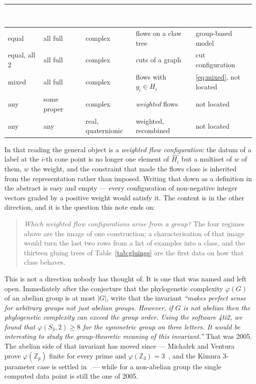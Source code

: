\documentclass[11pt,a4paper]{article}
\theoremstyle{definition}
\newcommand{\ZZ}{\mathbb{Z}}
\begin{document}
\begin{center}\small
\begin{tabular}{lllll}
\toprule
\rowcolor{hdrblue}
\textcolor{white}{cone orders} & \textcolor{white}{stabilisers} & \textcolor{white}{type} &
\textcolor{white}{configuration} & \textcolor{white}{name}\\
\midrule
equal & all full & complex & flows on a claw tree & group-based model~\cite{SSphylo}\\
\rowcolor{softgrey}
equal, all $2$ & all full & complex & cuts of a graph & cut configuration~\cite{SScuts}\\
mixed & all full & complex & flows with $g_i\in H_i$ & \eqref{eq:mixed}, not located\\
\rowcolor{softgrey}
any & some proper & complex & \emph{weighted} flows & not located\\
any & any & real, quaternionic & weighted, recombined & not located\\
\bottomrule
\end{tabular}
\end{center}

\noindent
In that reading the general object is a \emph{weighted flow configuration}: the datum of a label at
the $i$-th cone point is no longer one element of $\widehat{H_i}$ but a multiset of $w$ of them, $w$
the weight, and the constraint that made the flows close is inherited from the representation rather
than imposed. Writing that down as a definition in the abstract is easy and empty --- every
configuration of non-negative integer vectors graded by a positive weight would satisfy it. The
content is in the other direction, and it is the question this note ends on:

\begin{quote}
\emph{Which weighted flow configurations arise from a group?} The four regimes above are the image
of one construction; a characterisation of that image would turn the last two rows from a list of
examples into a class, and the thirteen gluing trees of Table~\ref{tab:gluings} are the first
data on how that class behaves.
\end{quote}

This is not a direction nobody has thought of. It is one that was named and left open. Immediately
after the conjecture that the phylogenetic complexity $\varphi(G)$ of an abelian group is at most
$|G|$, \cite{SSphylo} write that the invariant \emph{``makes perfect sense for arbitrary groups not
just abelian groups. However, if $G$ is not abelian then the phylogenetic complexity can exceed the
group order. Using the software 4ti2, we found that $\varphi(S_3,2)\ge8$ for the symmetric group on
three letters. It would be interesting to study the group-theoretic meaning of this invariant.''}
That was 2005. The abelian side of that invariant has moved since --- Micha{\l}ek and Ventura prove
$\varphi(\ZZ_p)$ finite for every prime and $\varphi(\ZZ_3)=3$~\cite{MV}, and the Kimura
3-parameter case is settled in~\cite{MV2} --- while for a non-abelian group the single computed
data point is still the one of 2005.
\end{document}
